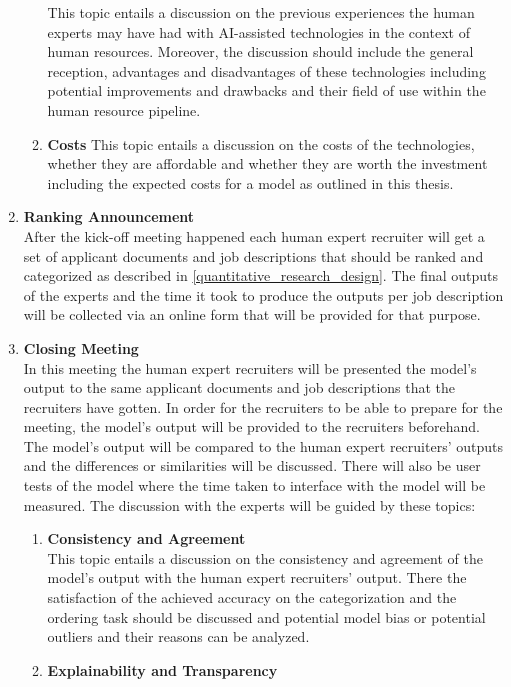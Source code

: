 \documentclass[draft,final]{thesisclass} %
\begin{document}
\begin{enumerate}
\begin{enumerate}
        This topic entails a discussion on the previous experiences the human experts may have had with \acs{AI}-assisted technologies in the context of human resources.
        Moreover, the discussion should include the general reception, advantages and disadvantages of these technologies including potential improvements and drawbacks and their field of use within the human resource pipeline.
        \item \textbf{Costs}
        This topic entails a discussion on the costs of the technologies, whether they are affordable and whether they are worth the investment including the expected costs for a model as outlined in this thesis. 
    \end{enumerate}
    \item \textbf{Ranking Announcement} \label{ranking_announcement}\\
    After the kick-off meeting happened each human expert recruiter will get a set of applicant documents and job descriptions that should be ranked and categorized as described in \ref{quantitative_research_design}.
    The final outputs of the experts and the time it took to produce the outputs per job description will be collected via an online form that will be provided for that purpose.
    \item \textbf{Closing Meeting} \label{closing_meeting}\\ 
    In this meeting the human expert recruiters will be presented the model's output to the same applicant documents and job descriptions that the recruiters have gotten.
    In order for the recruiters to be able to prepare for the meeting, the model's output will be provided to the recruiters beforehand.
    The model's output will be compared to the human expert recruiters' outputs and the differences or similarities will be discussed.
    There will also be user tests of the model where the time taken to interface with the model will be measured.
    The discussion with the experts will be guided by these topics:
    \begin{enumerate} 
        \item \textbf{Consistency and Agreement}\\
        This topic entails a discussion on the consistency and agreement of the model's output with the human expert recruiters' output.
        There the satisfaction of the achieved accuracy on the categorization and the ordering task should be discussed and potential model bias or potential outliers and their reasons can be analyzed.
        \item \textbf{Explainability and Transparency}\\

\end{enumerate}
\end{enumerate}
\end{document}
